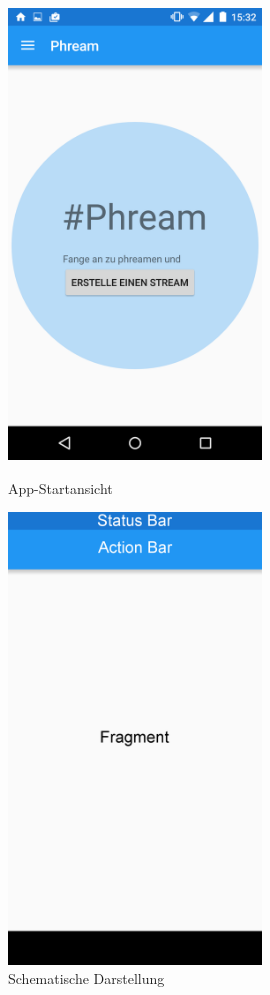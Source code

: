 \begin{figure}[H]
\centering
	\begin{minipage}{0.4\textwidth} 
	\centering
	\includegraphics[width=0.6\textwidth]{images/screenshots/startview.png}
	\caption{App-Startansicht}
	\label{label:startview}
	\end{minipage}
	\hfill
	\begin{minipage}{0.4\textwidth}
	\centering
	\includegraphics[width=0.6\textwidth]{images/screenshots/startview_schema.png}
	\caption{Schematische Darstellung}
	\label{label:startview_schema}
	\end{minipage}
\end{figure}
